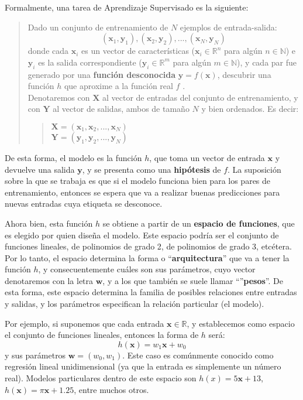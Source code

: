 \documentclass[../../main.tex]{subfiles}
\begin{document}
Formalmente, una tarea de Aprendizaje Supervisado es la siguiente:
\begin{quote}
    Dado un conjunto de entrenamiento de \(N\) ejemplos de entrada-salida:
    \[(\mathbf{x}_1, \mathbf{y}_1), (\mathbf{x}_2, \mathbf{y}_2), ..., (\mathbf{x}_N,
    \mathbf{y}_N)\] donde cada \(\mathbf{x}_i\) es un vector de características
    (\(\mathbf{x}_i \in \mathbb{R}^n\) para algún \(n \in \mathbb{N}\)) e \(\mathbf{y}_i\)
    es la salida correspondiente (\(\mathbf{y}_i \in \mathbb{R}^m\) para algún \(m \in
    \mathbb{N}\)), y cada par fue generado por una \textbf{función desconocida}
    \(\mathbf{\mathbf{y}}=f(\mathbf{x})\), descubrir una función \(h\) que aproxime a la
    función real \(f\) \cite{ai-a-modern-approach}.\\
    Denotaremos con \(\mathbf{X}\) al vector de entradas del conjunto de entrenamiento, y
    con \(\mathbf{Y}\) al vector de salidas, ambos de tamaño \(N\) y bien ordenados. Es
    decir:
    \begin{quote}
        \(\mathbf{X}=(\mathbf{x}_1, \mathbf{x}_2, ..., \mathbf{x}_N)\)\\
        \(\mathbf{Y}=(\mathbf{y}_1, \mathbf{y}_2, ..., \mathbf{y}_N)\)
    \end{quote}
\end{quote}
De esta forma, el modelo es la función \(h\), que toma un vector de entrada \(\mathbf{x}\)
y devuelve una salida \(\mathbf{y}\), y se presenta como una \textbf{hipótesis} de \(f\).
La suposición sobre la que se trabaja es que si el modelo funciona bien para los pares de
entrenamiento, entonces se espera que va a realizar buenas predicciones para nuevas
entradas cuya etiqueta se desconoce.

Ahora bien, esta función \(h\) se obtiene a partir de un \textbf{espacio de funciones},
que es elegido por quien diseña el modelo. Este espacio podría ser el conjunto de
funciones lineales, de polinomios de grado 2, de polinomios de grado 3, etcétera. Por lo
tanto, el espacio determina la forma o ``\textbf{arquitectura}'' que va a tener la función
\(h\), y consecuentemente cuáles son sus parámetros, cuyo vector denotaremos con la letra
\(\bm{\bm{w}}\), y a los que también se suele llamar ``''\textbf{pesos}''. De esta forma,
este espacio determina la familia de posibles relaciones entre entradas y salidas, y los
parámetros especifican la relación particular (el modelo).

Por ejemplo, si suponemos que cada entrada \(\mathbf{x} \in \mathbb{R}\), y establecemos
como espacio el conjunto de funciones lineales, entonces la forma de \(h\) será:
\[h(\mathbf{x}) = w_1 \mathbf{x} + w_0\] y sus parámetros \(\bm{w}=(w_0, w_1)\). Este caso
es comúnmente conocido como regresión lineal unidimensional (ya que la entrada es
simplemente un número real). Modelos particulares dentro de este espacio son \(h(x) = 5
\mathbf{x} + 13\), \(h(\mathbf{x}) = \pi \mathbf{x} + 1.25\), entre muchos otros.
\end{document}
